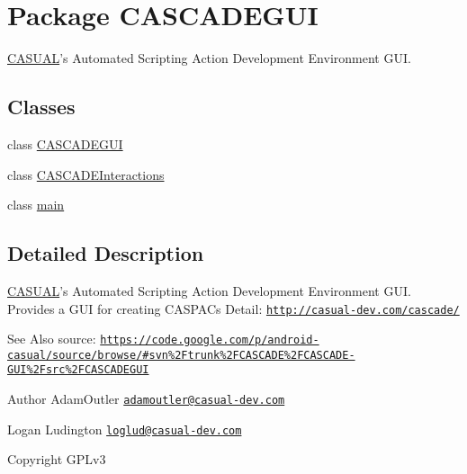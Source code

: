 \hypertarget{namespaceCASCADEGUI}{\section{Package C\-A\-S\-C\-A\-D\-E\-G\-U\-I}
\label{namespaceCASCADEGUI}
}


\hyperlink{namespaceCASUAL}{C\-A\-S\-U\-A\-L}'s Automated Scripting Action Development Environment G\-U\-I.  


\subsection*{Classes}
\begin{DoxyCompactItemize}
\item 
class \hyperlink{classCASCADEGUI_1_1CASCADEGUI}{C\-A\-S\-C\-A\-D\-E\-G\-U\-I}
\item 
class \hyperlink{classCASCADEGUI_1_1CASCADEInteractions}{C\-A\-S\-C\-A\-D\-E\-Interactions}
\item 
class \hyperlink{classCASCADEGUI_1_1main}{main}
\end{DoxyCompactItemize}


\subsection{Detailed Description}
\hyperlink{namespaceCASUAL}{C\-A\-S\-U\-A\-L}'s Automated Scripting Action Development Environment G\-U\-I. Provides a G\-U\-I for creating C\-A\-S\-P\-A\-Cs Detail\-: \href{http://casual-dev.com/cascade/}{\tt http\-://casual-\/dev.\-com/cascade/} \begin{DoxySeeAlso}{See Also}
source\-: \href{https://code.google.com/p/android-casual/source/browse/#svn%2Ftrunk%2FCASCADE%2FCASCADE-GUI%2Fsrc%2FCASCADEGUI}{\tt https\-://code.\-google.\-com/p/android-\/casual/source/browse/\#svn\%2\-Ftrunk\%2\-F\-C\-A\-S\-C\-A\-D\-E\%2\-F\-C\-A\-S\-C\-A\-D\-E-\/\-G\-U\-I\%2\-Fsrc\%2\-F\-C\-A\-S\-C\-A\-D\-E\-G\-U\-I} 
\end{DoxySeeAlso}
\begin{DoxyAuthor}{Author}
Adam\-Outler \href{mailto:adamoutler@casual-dev.com}{\tt adamoutler@casual-\/dev.\-com} 

Logan Ludington \href{mailto:loglud@casual-dev.com}{\tt loglud@casual-\/dev.\-com} 
\end{DoxyAuthor}
\begin{DoxyCopyright}{Copyright}
G\-P\-Lv3 
\end{DoxyCopyright}
